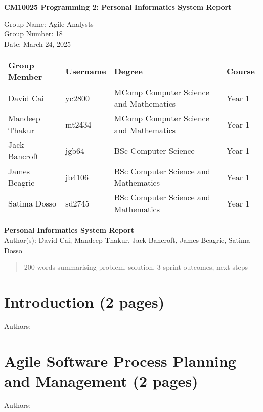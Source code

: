 \documentclass[12pt,a4paper]{article}
\begin{document}
\begin{titlepage}
    \centering
    {\Large\bfseries CM10025 Programming 2: Personal Informatics System Report\par}
    \vspace{1cm}
    Group Name: Agile Analysts \\
    Group Number: 18 \\
    Date: March 24, 2025

    \vspace{2cm}
    \begin{tabular}{llll}
        \toprule
        Group Member & Username & Degree & Course \\
        \midrule
        David Cai & yc2800 & MComp Computer Science and Mathematics & Year 1 \\
        Mandeep Thakur & mt2434 &  MComp Computer Science and Mathematics & Year 1\\
        Jack Bancroft & jgb64 & BSc Computer Science & Year 1\\
        James Beagrie & jb4106 & BSc Computer Science and Mathematics & Year 1\\
        Satima Dosso & sd2745 & BSc Computer Science and Mathematics & Year 1 \\
    \end{tabular}
    \thispagestyle{empty}
\end{titlepage}

\begin{center}
    {\Large\bfseries Personal Informatics System Report}\\[1ex]
    Author(s): David Cai, Mandeep Thakur, Jack Bancroft, James Beagrie, Satima Dosso
\end{center}
\begin{abstract}
    200 words summarising problem, solution, 3 sprint outcomes, next steps
    
\end{abstract}
\newpage

\tableofcontents
\newpage




\section{Introduction (2 pages)}
Authors:
\label{sec:intro}


\section{Agile Software Process Planning and Management (2 pages)}
Authors:
\label{sec:agile}
\end{document}
